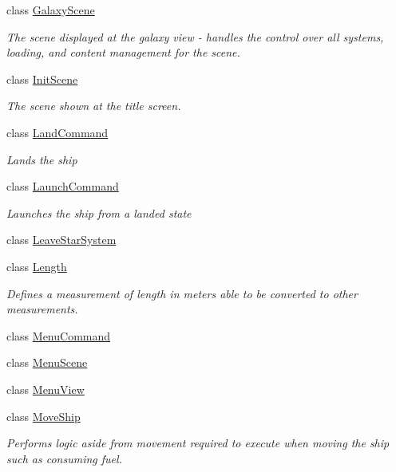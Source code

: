 \begin{DoxyCompactItemize}
class \hyperlink{class_midnight_blue_1_1_galaxy_scene}{Galaxy\+Scene}
\begin{DoxyCompactList}\small\item\em The scene displayed at the galaxy view -\/ handles the control over all systems, loading, and content management for the scene. \end{DoxyCompactList}\item 
class \hyperlink{class_midnight_blue_1_1_init_scene}{Init\+Scene}
\begin{DoxyCompactList}\small\item\em The scene shown at the title screen. \end{DoxyCompactList}\item 
class \hyperlink{class_midnight_blue_1_1_land_command}{Land\+Command}
\begin{DoxyCompactList}\small\item\em Lands the ship \end{DoxyCompactList}\item 
class \hyperlink{class_midnight_blue_1_1_launch_command}{Launch\+Command}
\begin{DoxyCompactList}\small\item\em Launches the ship from a landed state \end{DoxyCompactList}\item 
class \hyperlink{class_midnight_blue_1_1_leave_star_system}{Leave\+Star\+System}
\item 
class \hyperlink{class_midnight_blue_1_1_length}{Length}
\begin{DoxyCompactList}\small\item\em Defines a measurement of length in meters able to be converted to other measurements. \end{DoxyCompactList}\item 
class \hyperlink{class_midnight_blue_1_1_menu_command}{Menu\+Command}
\item 
class \hyperlink{class_midnight_blue_1_1_menu_scene}{Menu\+Scene}
\item 
class \hyperlink{class_midnight_blue_1_1_menu_view}{Menu\+View}
\item 
class \hyperlink{class_midnight_blue_1_1_move_ship}{Move\+Ship}
\begin{DoxyCompactList}\small\item\em Performs logic aside from movement required to execute when moving the ship such as consuming fuel. \end{DoxyCompactList}\item 

\end{DoxyCompactItemize}
